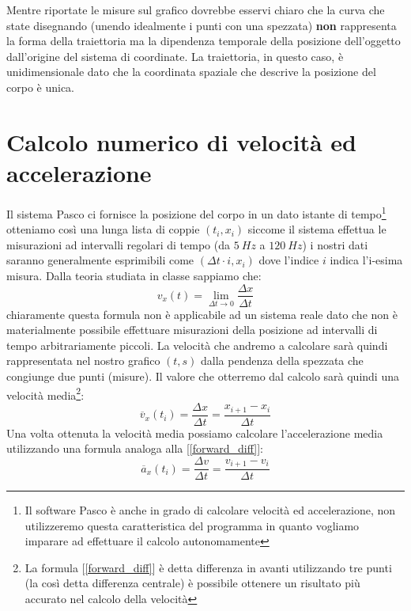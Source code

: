 \documentclass[a4paper,10pt,oneside]{article}
\begin{document}
Mentre riportate le misure sul grafico dovrebbe esservi chiaro che la curva che state disegnando (unendo idealmente i punti con una spezzata) \textbf{non} rappresenta la forma della traiettoria ma la dipendenza temporale della posizione dell'oggetto dall'origine del sistema di coordinate. La traiettoria, in questo caso, è unidimensionale dato che la coordinata spaziale che descrive la posizione del corpo è unica.

\section{Calcolo numerico di velocità ed accelerazione}

Il sistema Pasco ci fornisce la posizione del corpo in un dato istante di tempo\footnote{Il software Pasco è anche in grado di calcolare velocità ed accelerazione, non utilizzeremo questa caratteristica del programma in quanto vogliamo imparare ad effettuare il calcolo autonomamente} otteniamo così una lunga lista di coppie $(t_i,x_i)$ siccome il sistema effettua le misurazioni ad intervalli regolari di tempo (da $5\ Hz$ a $120\ Hz$) i nostri dati saranno generalmente esprimibili come $(\Delta t\cdot i,x_i)$ dove l'indice $i$ indica l'i-esima misura.
Dalla teoria studiata in classe sappiamo che:
\begin{equation}
 v_x(t)=\lim _{\Delta t \to 0} \frac {\Delta x}{\Delta t}
\end{equation}
chiaramente questa formula non è applicabile ad un sistema reale dato che non è materialmente possibile effettuare misurazioni della posizione ad intervalli di tempo arbitrariamente piccoli. La velocità che andremo a calcolare sarà quindi rappresentata nel nostro grafico $(t,s)$ dalla pendenza della spezzata che congiunge due punti (misure). Il valore che otterremo dal calcolo sarà quindi una velocità media\footnote{
La formula [\ref{forward_diff}] è detta differenza in avanti utilizzando tre punti (la così detta differenza centrale) è possibile ottenere un risultato più accurato nel calcolo della velocità }:
\begin{equation}\label{forward_diff}
\overline{v}_x(t_i)=\frac{\Delta x}{\Delta t}=\frac{x_{i+1}-x_i}{\Delta t}
\end{equation}
Una volta ottenuta la velocità media possiamo calcolare l'accelerazione media utilizzando una formula analoga alla [\ref{forward_diff}]:
\begin{equation}
 \overline{a}_x(t_i)=\frac{\Delta v}{\Delta t}=\frac{v_{i+1}-v_i}{\Delta t}
\end{equation}
\end{document}
